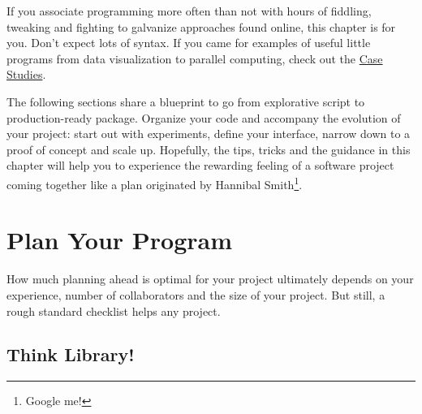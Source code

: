 \documentclass[
  12pt,
  letterpaper,
]{krantz}
\begin{document}
If you associate programming more often than not with hours of fiddling,
tweaking and fighting to galvanize approaches found online, this chapter
is for you. Don't expect lots of syntax. If you came for examples of
useful little programs from data visualization to parallel computing,
check out the \protect\hyperlink{case-studies}{Case Studies}.

The following sections share a blueprint to go from explorative script
to production-ready package. Organize your code and accompany the
evolution of your project: start out with experiments, define your
interface, narrow down to a proof of concept and scale up. Hopefully,
the tips, tricks and the guidance in this chapter will help you to
experience the rewarding feeling of a software project coming together
like a plan originated by Hannibal Smith\footnote{Google me!}.

\hypertarget{plan-your-program}{%
\section{Plan Your Program}\label{plan-your-program}}

How much planning ahead is optimal for your project ultimately depends
on your experience, number of collaborators and the size of your
project. But still, a rough standard checklist helps any project.

\hypertarget{think-library}{%
\subsection{Think Library!}\label{think-library}}
\end{document}
